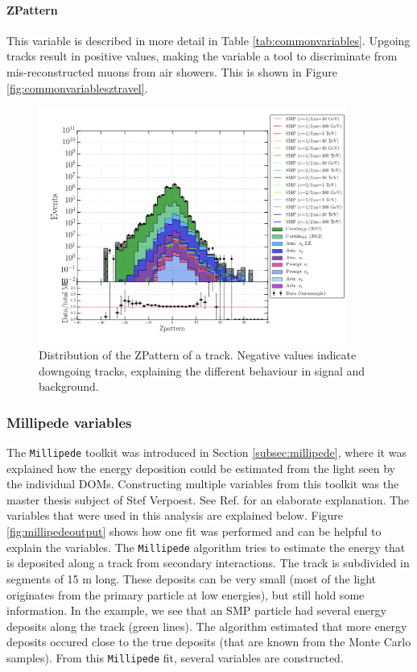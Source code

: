 \paragraph{ZPattern}
This variable is described in more detail in Table \ref{tab:commonvariables}. Upgoing tracks result in positive values, making the variable a tool to discriminate from mis-reconstructed muons from air showers. This is shown in Figure \ref{fig:commonvariablesztravel}.

\begin{figure}
\centering
\includegraphics[width = 0.9\textwidth]{chapter8/img/1D_stack_zpattern.png}
\caption{Distribution of the ZPattern of a track. Negative values indicate downgoing tracks, explaining the different behaviour in signal and background.}
\label{fig:commonvariableszpattern}
\end{figure}


\subsubsection{Millipede variables}
The \texttt{Millipede} toolkit was introduced in Section \ref{subsec:millipede}, where it was explained how the energy deposition could be estimated from the light seen by the individual DOMs. Constructing multiple variables from this toolkit was the master thesis subject of Stef Verpoest. See Ref. \cite{steffthesis} for an elaborate explanation. The variables that were used in this analysis are explained below. Figure \ref{fig:millipedeoutput} shows how one fit was performed and can be helpful to explain the variables. The \texttt{Millipede} algorithm tries to estimate the energy that is deposited along a track from secondary interactions. The track is subdivided in segments of 15 m long. These deposits can be very small (most of the light originates from the primary particle at low energies), but still hold some information. In the example, we see that an SMP particle had several energy deposits along the track (green lines). The algorithm estimated that more energy deposits occured close to the true deposits (that are known from the Monte Carlo samples). From this \texttt{Millipede} fit, several variables are constructed.

